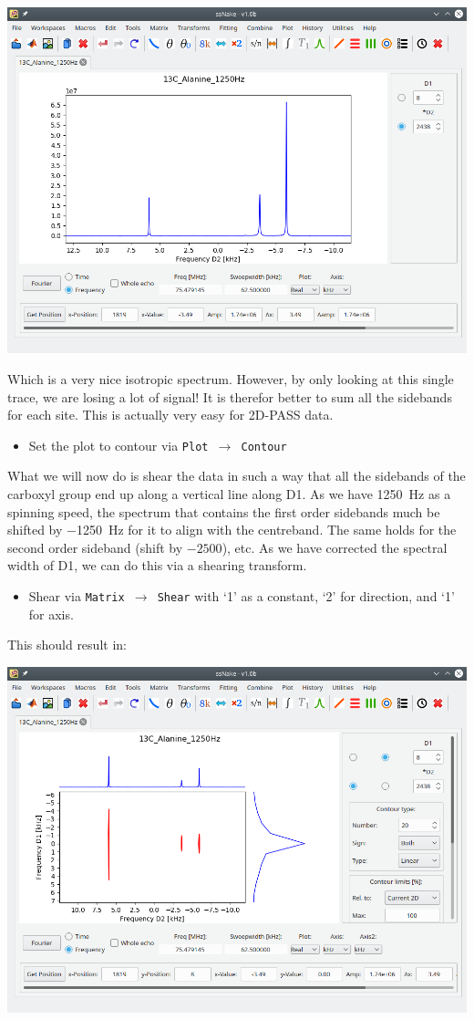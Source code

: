 \documentclass[11pt,a4paper]{article}
\begin{document}
\begin{center}
\includegraphics[width=0.8\linewidth]{Figs/Fig5.png}
\end{center}
Which is a very nice isotropic spectrum.
However, by only looking at this single trace, we are losing a lot of signal!
It is therefor better to sum all the sidebands for each site.
This is actually very easy for 2D-PASS data.
\begin{itemize}
  \item Set the plot to contour via \texttt{Plot $\longrightarrow$ Contour}
\end{itemize}
What we will now do is shear the data in such a way that all the sidebands of the carboxyl group end up along a vertical line along D1.
As we have \SI{1250}{\Hz} as a spinning speed, the spectrum that contains the first order sidebands much be shifted by \SI{-1250}{\Hz} for it to align with the centreband.
The same holds for the second order sideband (shift by $-2500$), etc.
As we have corrected the spectral width of D1, we can do this via a shearing transform.
\begin{itemize}
  \item Shear via \texttt{Matrix $\longrightarrow$ Shear} with `1' as a constant, `2' for direction,
	 and `1' for axis.
\end{itemize}
This should result in:
\begin{center}
\includegraphics[width=0.8\linewidth]{Figs/Fig6.png}
\end{center}
\end{document}
